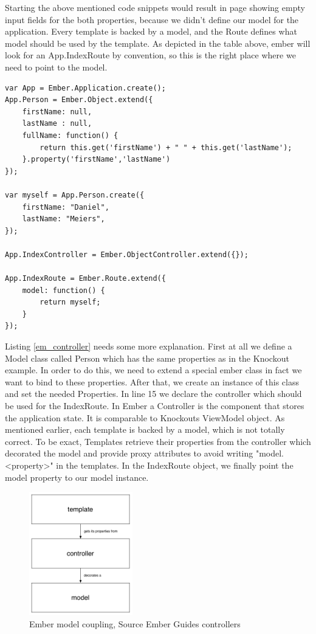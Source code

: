 Starting the above mentioned code snippets would result in page showing empty input fields for the both properties, because we didn't define our model for the application. 
Every template is backed by a model, and the Route defines what model should be used by the template. As depicted in the table above, ember will look for an App.IndexRoute by convention, so this is the right place where we need to point to the model.

\begin{lstlisting}[label=em_controller,caption=app.js]
var App = Ember.Application.create();
App.Person = Ember.Object.extend({
	firstName: null,
	lastName : null,
    fullName: function() {
        return this.get('firstName') + " " + this.get('lastName');
    }.property('firstName','lastName')
});

var myself = App.Person.create({
    firstName: "Daniel",
    lastName: "Meiers",
});

App.IndexController = Ember.ObjectController.extend({});

App.IndexRoute = Ember.Route.extend({
    model: function() {
        return myself;
    }
});
\end{lstlisting}

Listing \ref{em_controller} needs some more explanation. First at all we define a Model class called Person which has the same properties as in the Knockout example. In order to do this, we need to extend a special ember class in fact we want to bind to these properties. After that, we create an instance of this class and set the needed Properties. In line 15 we declare the controller which should be used for the IndexRoute. In Ember a Controller is the component that stores the application state. It is comparable to Knockouts ViewModel object. As mentioned earlier, each template is backed by a model, which is not totally correct. To be exact, Templates retrieve their properties from the controller which decorated the model and provide proxy attributes to avoid writing "model.<property>" in the templates. In the IndexRoute object, we finally point the model property to our model instance.

\begin{figure}
	\centering	\includegraphics[width=0.4\textwidth]{./img/ember_controller_coupling.png}
	\caption{Ember model coupling, Source Ember Guides controllers}
	\label{fig:ember_coupling}
\end{figure} 
 

